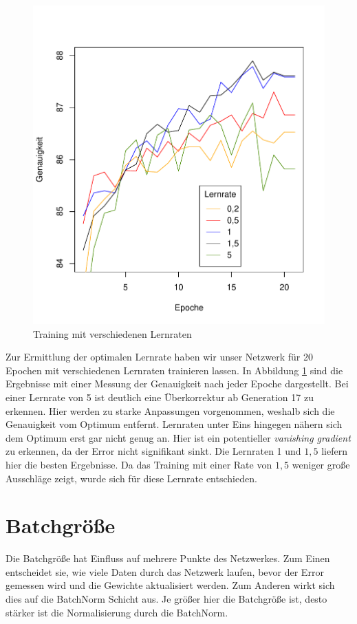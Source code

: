 \begin{figure}[H]
	\centering
	\includegraphics[scale=0.9]{./bilder/learningrate}
	\caption{Training mit verschiedenen Lernraten}
	\label{fig:learningrate}
\end{figure}

Zur Ermittlung der optimalen Lernrate haben wir unser Netzwerk für 20 Epochen mit verschiedenen Lernraten trainieren lassen. In Abbildung \ref{fig:learningrate} sind die Ergebnisse mit einer Messung der Genauigkeit nach jeder Epoche dargestellt. Bei einer Lernrate von 5 ist deutlich eine Überkorrektur ab Generation 17 zu erkennen. Hier werden zu starke Anpassungen vorgenommen, weshalb sich die Genauigkeit vom Optimum entfernt. Lernraten unter Eins hingegen nähern sich dem Optimum erst gar nicht genug an. Hier ist ein potentieller \textit{vanishing gradient} zu erkennen, da der Error nicht signifikant sinkt.  Die Lernraten 1 und $1,5$ liefern hier die besten Ergebnisse. Da das Training mit einer Rate von $1,5$ weniger große Ausschläge zeigt, wurde sich für diese Lernrate entschieden.
\section{Batchgröße}
Die Batchgröße hat Einfluss auf mehrere Punkte des Netzwerkes. Zum Einen entscheidet sie, wie viele Daten durch das Netzwerk laufen, bevor der Error gemessen wird und die Gewichte aktualisiert werden. Zum Anderen wirkt sich dies auf die BatchNorm Schicht aus. Je größer hier die Batchgröße ist, desto stärker ist die Normalisierung durch die BatchNorm.

